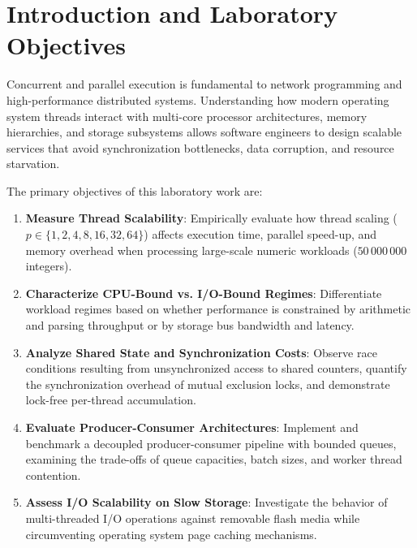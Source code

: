 \documentclass[11pt,a4paper]{article}
\begin{document}
\section{Introduction and Laboratory Objectives}

Concurrent and parallel execution is fundamental to network programming and high-performance distributed systems. Understanding how modern operating system threads interact with multi-core processor architectures, memory hierarchies, and storage subsystems allows software engineers to design scalable services that avoid synchronization bottlenecks, data corruption, and resource starvation.

The primary objectives of this laboratory work are:
\begin{enumerate}
    \item \textbf{Measure Thread Scalability}: Empirically evaluate how thread scaling ($p \in \{1, 2, 4, 8, 16, 32, 64\}$) affects execution time, parallel speed-up, and memory overhead when processing large-scale numeric workloads ($50\,000\,000$ integers).
    \item \textbf{Characterize CPU-Bound vs. I/O-Bound Regimes}: Differentiate workload regimes based on whether performance is constrained by arithmetic and parsing throughput or by storage bus bandwidth and latency.
    \item \textbf{Analyze Shared State and Synchronization Costs}: Observe race conditions resulting from unsynchronized access to shared counters, quantify the synchronization overhead of mutual exclusion locks, and demonstrate lock-free per-thread accumulation.
    \item \textbf{Evaluate Producer-Consumer Architectures}: Implement and benchmark a decoupled producer-consumer pipeline with bounded queues, examining the trade-offs of queue capacities, batch sizes, and worker thread contention.
    \item \textbf{Assess I/O Scalability on Slow Storage}: Investigate the behavior of multi-threaded I/O operations against removable flash media while circumventing operating system page caching mechanisms.
\end{enumerate}

\end{document}
